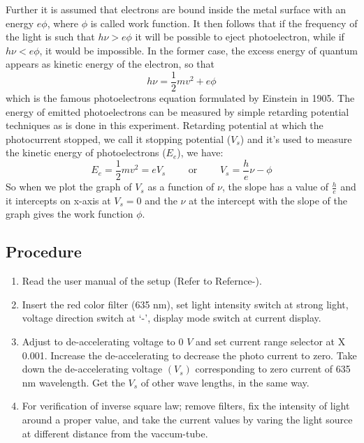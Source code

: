 \documentclass[%
 sor,
 jor,
 amsmath,amssymb,
 reprint,%
]{revtex4-2}
\begin{document}
Further it is assumed that electrons are bound inside the metal surface with an energy $e\phi$, where $\phi$ is called work function. It then follows that if the frequency of the light is such that $h\nu > e \phi$ it will be possible to eject photoelectron, while if $h\nu < e \phi$, it would be impossible. In the former case, the excess energy of quantum appears as kinetic energy of the electron, so that \begin{equation}h\nu = \frac 1 2 mv^2 + e\phi \end{equation} which is the famous photoelectrons equation formulated by Einstein in 1905. The energy of emitted photoelectrons can be measured by simple retarding potential techniques as is done in this experiment.
Retarding potential at which the photocurrent stopped, we call it stopping potential ($V_s$) and it's used to measure the kinetic energy of photoelectrons ($E_e$), we have: 
\begin{equation}E_e = \frac 1 2 mv^2 = eV_s \,\,\,\,\,\,\,\,\,\,\,\,\,\,  \text{or} \,\,\,\,\,\,\,\,\,\,\,\,\,\, V_s = \frac h e \nu-\phi \end{equation}
So when we plot the graph of $V_s$ as a function of $\nu$, the slope has a value of $\frac h e $ and it intercepts on x-axis at $V_s = 0$ and the $\nu$ at the intercept with the slope of the graph gives the work function $\phi$.


\subsection{Procedure}

\begin{enumerate}
	\item Read the user manual of the setup (Refer to Refernce-\cite{fsu_manual}).
  \item Insert the red color filter (635 nm), set light intensity switch at strong light, voltage direction switch at `-', display mode switch at current display.
  \item Adjust to de-accelerating voltage to 0 $V$  and set current range selector at X 0.001. Increase the de-accelerating to decrease the photo current to zero. Take down the de-accelerating voltage $(V_s)$ corresponding to zero current of 635 nm wavelength. Get the $V_s$ of other wave lengths, in the same way.
  \item For verification of inverse square law; remove filters, fix the intensity of light around a proper value, and take the current values by varing the light source at different distance from the vaccum-tube.
\end{enumerate}
\end{document}
